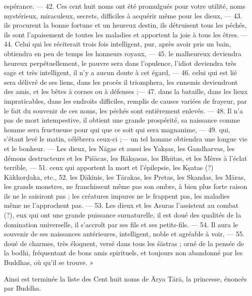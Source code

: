 \documentclass[a4paper, 11pt, oneside, french, landscape, twocolumn]{article}
\begin{document}
espérance. --- 42. Ces cent huit noms ont été promulgués pour votre utilité, noms mystérieux, miraculeux, secrets, difficiles à acquérir même pour les dieux, --- 43. ils procurent la bonne fortune et un heureux destin, ils détruisent tous les péchés, ils sont l'apaisement de toutes les maladies et apportent la joie à tous les êtres. --- 44. Celui qui les réciterait trois fois intelligent, pur, après avoir pris un bain, obtiendra en peu de temps les honneurs royaux, --- 45. le malheureux deviendra heureux perpétuellement, le pauvre sera dans l'opulence, l'idiot deviendra très sage et très intelligent, il n'y a aucun doute à cet égard, --- 46. celui qui est lié sera délivré de ses liens, dans les procès il triomphera, les ennemis deviendront des amis, et les bêtes à cornes ou à défenses ;--- 47. dans la bataille, dans les lieux impraticables, dans les endroits difficiles, remplis de causes variées de frayeur, par le fait du souvenir de ces noms, les péchés sont entièrement enlevés. --- 48. Il n'a pas de mort intempestive, il obtient une grande prospérité, sa naissance comme homme sera fructueuse pour qui que ce soit qui sera magnanime, --- 49. qui, s'étant levé le matin, célébrera ceux-ci ;--- un tel homme obtiendra une longue vie et le bonheur. --- Les dieux, les N\={a}gas et aussi les Yak\d{s}as, les Gandharvas, les démons destructeurs et les Pi\'{s}\={a}cas, les R\={a}k\d{s}asas, les Bh\={u}tas, et les Mères à l'éclat terrible, --- 51. ceux qui apportent la mort et l'épilepsie, les K\d{s}atas (?) K\={a}khor\d{d}aka, etc., 52. les Ḍ\={a}kinis, les T\={a}rakas, les Pretas, les Skandas, les M\={a}ras, les grands monstres, ne franchissent même pas son ombre, à bien plus forte raison ils ne le saisiront pas ; les créatures impures ne le frappent pas, les maladies même ne l'approchent pas. --- 53. Les dieux et les Asuras l'assistent au combat (?), eux qui ont une grande puissance surnaturelle, il est doué des qualités de la domination universelle, il s'accroît par ses fils et ses petits-fils. --- 54. Il aura le souvenir de ses naissances antérieures, intelligent, noble et agréable à voir, --- 55. doué de charmes, très éloquent, versé dans tous les \'{s}\={a}stras ; orné de la pensée de la bodhi, fréquentant de bons amis spirituels, et toujours non abandonné par les Buddhas, où qu'il se trouve. »

Ainsi est terminée la liste des Cent huit noms de \={A}rya T\={a}r\={a}, la princesse, énoncés par Buddha.
\clearpage
\end{document}
